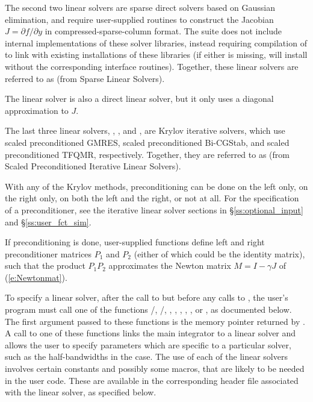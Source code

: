The second two linear solvers are sparse direct solvers based on
Gaussian elimination, and require user-supplied routines to construct
the Jacobian $J = \partial{f}/\partial{y}$ in compressed-sparse-column
format. The {\sundials} suite does not include internal
implementations of these solver libraries, instead requiring
compilation of {\sundials} to link with existing installations of
these libraries (if either is missing, {\sundials} will install
without the corresponding interface routines).  Together, these linear
solvers are referred to as {\cvsls} (from Sparse Linear Solvers). 

The {\cvdiag} linear solver is also a direct linear solver, but it
only uses a diagonal approximation to $J$.

The last three {\cvodes} linear solvers, {\cvspgmr}, {\cvspbcg}, and {\cvsptfqmr},
are Krylov iterative solvers, which use scaled preconditioned GMRES, scaled
preconditioned Bi-CGStab, and scaled preconditioned TFQMR, respectively.
Together, they are referred to as {\cvspils} (from Scaled Preconditioned 
Iterative Linear Solvers).

With any of the Krylov methods, preconditioning can be done on the left only, 
on the right only, on both the left and the right, or not at all. 
For the specification of a preconditioner, see the iterative linear solver sections 
in \S\ref{ss:optional_input} and \S\ref{ss:user_fct_sim}.

If preconditioning is done, user-supplied functions define left and right 
preconditioner matrices $P_1$ and $P_2$ (either of which could be the identity
matrix), such that the product $P_1 P_2$ approximates the Newton matrix
$M = I - \gamma J$ of (\ref{e:Newtonmat}).

To specify a {\cvodes} linear solver, after the call to 
but before any calls to , the user's program must call one
of the functions /, /, 
, , , , ,
or , as documented below. 
The first argument passed to these functions is the {\cvodes}
memory pointer returned by .  A call to one of these
functions links the main {\cvodes} integrator to a linear solver and
allows the user to specify parameters which are specific to a
particular solver, such as the half-bandwidths in the {\cvband} case.
The use of each of the linear solvers involves certain constants and possibly 
some macros, that are likely to be needed in the user code.  These are
available in the corresponding header file associated with the linear
solver, as specified below.

